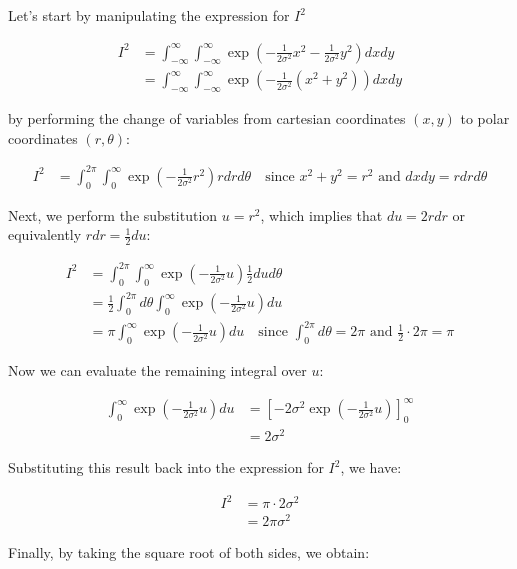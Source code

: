 \documentclass{article}
\begin{document}
\begin{tcolorbox}[breakable,colback=gray!5,colframe=gray!60,title=Solution]
Let's start by manipulating the expression for $I^2$

\begin{align*}
  I^2 &= \int_{-\infty}^{\infty} \int_{-\infty}^{\infty}  \exp\left( -\frac{1}{2\sigma^2} x^2 -\frac{1}{2\sigma^2} y^2 \right) dx dy \\
  &= \int_{-\infty}^{\infty} \int_{-\infty}^{\infty}  \exp\left( -\frac{1}{2\sigma^2} (x^2 + y^2) \right) dx dy
\end{align*}

by performing the change of variables from cartesian coordinates $(x, y)$ to polar coordinates $(r, \theta)$:

\begin{align*}
  I^2 &= \int_{0}^{2\pi} \int_{0}^{\infty}  \exp\left( -\frac{1}{2\sigma^2} r^2 \right) r dr d\theta \quad \text{since } x^2 + y^2 = r^2 \text{ and } dx dy = r dr d\theta
\end{align*}

Next, we perform the substitution $u = r^2$, which implies that $du = 2r dr$ or equivalently $r dr = \frac{1}{2} du$:

\begin{align*}
  I^2 &= \int_{0}^{2\pi} \int_{0}^{\infty}  \exp\left( -\frac{1}{2\sigma^2} u \right) \frac{1}{2} du d\theta \\
  &= \frac{1}{2} \int_{0}^{2\pi} d\theta \int_{0}^{\infty}  \exp\left( -\frac{1}{2\sigma^2} u \right) du \\
  &= \pi \int_{0}^{\infty}  \exp\left( -\frac{1}{2\sigma^2} u \right) du \quad \text{since } \int_{0}^{2\pi} d\theta = 2\pi \text{ and } \frac{1}{2} \cdot 2\pi = \pi
\end{align*}

Now we can evaluate the remaining integral over $u$:

\begin{align*}
  \int_{0}^{\infty}  \exp\left( -\frac{1}{2\sigma^2} u \right) du &= \left[ -2\sigma^2 \exp\left( -\frac{1}{2\sigma^2} u \right) \right]_{0}^{\infty} \\
  &= 2\sigma^2
\end{align*}

Substituting this result back into the expression for $I^2$, we have:

\begin{align*}
  I^2 &= \pi \cdot 2\sigma^2 \\
  &= 2\pi\sigma^2
\end{align*}

Finally, by taking the square root of both sides, we obtain:


\end{tcolorbox}
\end{document}

